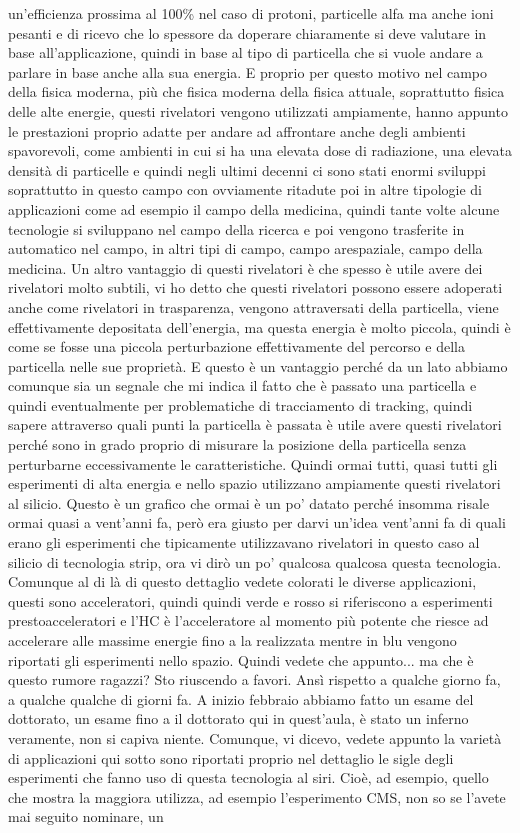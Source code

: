 {un'efficienza prossima al 100\% nel caso di protoni, particelle alfa ma anche ioni pesanti e di ricevo che lo spessore da doperare chiaramente si deve valutare in base all'applicazione, quindi in base al tipo di particella che si vuole andare a parlare in base anche alla sua energia. E proprio per questo motivo nel campo della fisica moderna, più che fisica moderna della fisica attuale, soprattutto fisica delle alte energie, questi rivelatori vengono utilizzati ampiamente, hanno appunto le prestazioni proprio adatte per andare ad affrontare anche degli ambienti spavorevoli, come ambienti in cui si ha una elevata dose di radiazione, una elevata densità di particelle e quindi negli ultimi decenni ci sono stati enormi sviluppi soprattutto in questo campo con ovviamente ritadute poi in altre tipologie di applicazioni come ad esempio il campo della medicina, quindi tante volte alcune tecnologie si sviluppano nel campo della ricerca e poi vengono trasferite in automatico nel campo, in altri tipi di campo, campo arespaziale, campo della medicina. Un altro vantaggio di questi rivelatori è che spesso è utile avere dei rivelatori molto subtili, vi ho detto che questi rivelatori possono essere adoperati anche come rivelatori in trasparenza, vengono attraversati della particella, viene effettivamente depositata dell'energia, ma questa energia è molto piccola, quindi è come se fosse una piccola perturbazione effettivamente del percorso e della particella nelle sue proprietà. E questo è un vantaggio perché da un lato abbiamo comunque sia un segnale che mi indica il fatto che è passato una particella e quindi eventualmente per problematiche di tracciamento di tracking, quindi sapere attraverso quali punti la particella è passata è utile avere questi rivelatori perché sono in grado proprio di misurare la posizione della particella senza perturbarne eccessivamente le caratteristiche. Quindi ormai tutti, quasi tutti gli esperimenti di alta energia e nello spazio utilizzano ampiamente questi rivelatori al silicio. Questo è un grafico che ormai è un po' datato perché insomma risale ormai quasi a vent'anni fa, però era giusto per darvi un'idea vent'anni fa di quali erano gli esperimenti che tipicamente utilizzavano rivelatori in questo caso al silicio di tecnologia strip, ora vi dirò un po' qualcosa qualcosa questa tecnologia. Comunque al di là di questo dettaglio vedete colorati le diverse applicazioni, questi sono acceleratori, quindi quindi verde e rosso si riferiscono a esperimenti prestoacceleratori e l'HC è l'acceleratore al momento più potente che riesce ad accelerare alle massime energie fino a la realizzata mentre in blu vengono riportati gli esperimenti nello spazio. Quindi vedete che appunto... ma che è questo rumore ragazzi? Sto riuscendo a favori. Ansì rispetto a qualche giorno fa, a qualche qualche di giorni fa. A inizio febbraio abbiamo fatto un esame del dottorato, un esame fino a il dottorato qui in quest'aula, è stato un inferno veramente, non si capiva niente. Comunque, vi dicevo, vedete appunto la varietà di applicazioni qui sotto sono riportati proprio nel dettaglio le sigle degli esperimenti che fanno uso di questa tecnologia al siri. Cioè, ad esempio, quello che mostra la maggiora utilizza, ad esempio l'esperimento CMS, non so se l'avete mai seguito nominare, un }
